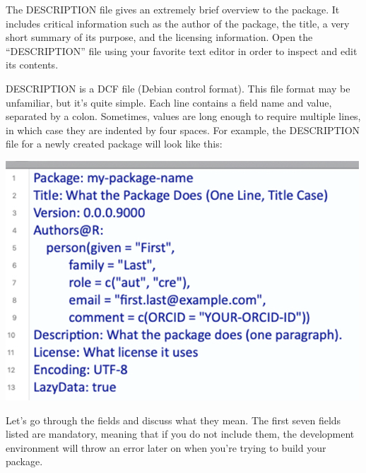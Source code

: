 \documentclass[
]{book}
\begin{document}
The DESCRIPTION file gives an extremely brief overview to the package. It includes critical information such as the author of the package, the title, a very short summary of its purpose, and the licensing information. Open the ``DESCRIPTION'' file using your favorite text editor in order to inspect and edit its contents.

DESCRIPTION is a DCF file (Debian control format). This file format may be unfamiliar, but it's quite simple. Each line contains a field name and value, separated by a colon. Sometimes, values are long enough to require multiple lines, in which case they are indented by four spaces. For example, the DESCRIPTION file for a newly created package will look like this:

\includegraphics{images/packageSS/description_blank.png}

Let's go through the fields and discuss what they mean. The first seven fields listed are mandatory, meaning that if you do not include them, the development environment will throw an error later on when you're trying to build your package.
\end{document}

